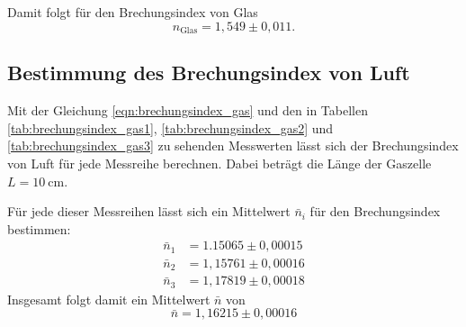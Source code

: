 Damit folgt für den Brechungsindex von Glas
\begin{equation}
    n_\text{Glas} = 1,549 \pm 0,011 .
\end{equation}

\subsection{Bestimmung des Brechungsindex von Luft}
Mit der Gleichung \ref{eqn:brechungsindex_gas} und den in Tabellen \ref{tab:brechungsindex_gas1}, \ref{tab:brechungsindex_gas2} und \ref{tab:brechungsindex_gas3} zu sehenden Messwerten lässt sich der Brechungsindex von Luft für jede Messreihe berechnen. Dabei beträgt die Länge der Gaszelle $L = \SI{10}{\centi \meter}$.



Für jede dieser Messreihen lässt sich ein Mittelwert $\bar{n}_i$ für den Brechungsindex bestimmen:
\begin{align}
    \bar{n}_1 &= 1.15065 \pm 0,00015 \\
    \bar{n}_2 &= 1,15761 \pm 0,00016 \\
    \bar{n}_3 &= 1,17819 \pm 0,00018
\end{align}
Insgesamt folgt damit ein Mittelwert $\bar{n}$ von
\begin{equation}
   \bar{n} = 1,16215 \pm 0,00016
\end{equation}
